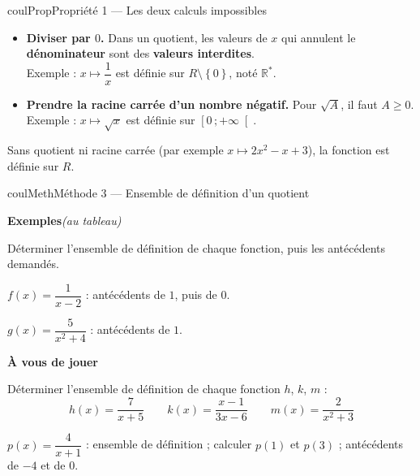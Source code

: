 \documentclass[11pt,a4paper]{article}
\makeatletter
\newcommand{\R}{\mathbb{R}}
\newcommand{\Rs}{\mathbb{R}^{*}}
\newcommand{\N}{\mathbb{N}}
\newcommand{\Z}{\mathbb{Z}}
\newcommand{\Q}{\mathbb{Q}}
\renewcommand{\ge}{\geqslant}
\newcommand{\vect}[1]{\overrightarrow{#1}}
\newcommand{\fois}[1]{\times{\color{coulExo}#1}}
\newcommand{\lycee@intfo}[2]{\left[#1\,;#2\right[}
\newcommand{\lycee@ens}[1]{\left\{#1\right\}}
\providecommand{\Cf}{\mathcal{C}\sb{f}}%
\providecommand{\Cg}{\mathcal{C}\sb{g}}%
\providecommand{\intfo}{\lycee@intfo}%
\providecommand{\ens}{\lycee@ens}}
\newcounter{lycee@signet}
\newcommand{\signet}[3][]{\stepcounter{lycee@signet}%
  \edef\lycee@dest{\if\relax\detokenize{#1}\relax
    signet.\arabic{lycee@signet}\else#1\fi}%
  \hypertarget{\lycee@dest}{}\bookmark[level=#2,dest=\lycee@dest]{#3}}
\def\R{R}\def\N{N}\def\Z{Z}\def\Q{Q}\def\vect#1{#1}\def\Cf{Cf}\def\Cg{Cg}\def\fois#1{×#1}%
\newcounter{methode}
\newenvironment{proprietebox}[1][Propriété]%
  {\begin{boitecours}[phantom={\signet{2}{#1}}]{coulProp}{#1}}{\end{boitecours}}
\newenvironment{methodebox}[1][Méthode]{\stepcounter{methode}%
  \begin{boitecours}[phantom={\signet[methode-\arabic{methode}]{2}{#1}}]{coulMeth}{#1}}%
  {\end{boitecours}}
\newcommand{\etape}[1]{\par\smallskip\textbf{\color{coulMeth}#1}\par\nobreak\smallskip}
\newcommand{\autableau}{\hfill{\footnotesize\itshape\color{black!45}(au tableau)}}
\newcommand{\etapeexemples}{%
    \par\smallskip\textbf{\color{coulMeth}Exemples}\autableau\par\nobreak\smallskip}
\makeatother
\begin{document}
\begin{proprietebox}[Propriété 1 --- Les deux calculs impossibles]
\begin{itemize}
  \item \textbf{Diviser par $0$.} Dans un quotient, les valeurs de $x$ qui annulent le
        \textbf{dénominateur} sont des \textbf{valeurs interdites}.\\
        Exemple : $x\mapsto\dfrac{1}{x}$ est définie sur $\R\setminus\ens{0}$, noté
        $\Rs$.
  \item \textbf{Prendre la racine carrée d'un nombre négatif.} Pour $\sqrt{A}$, il faut
        $A\ge 0$.\\
        Exemple : $x\mapsto\sqrt{x}$ est définie sur $\intfo{0}{+\infty}$.
\end{itemize}
Sans quotient ni racine carrée (par exemple $x\mapsto 2x^{2}-x+3$), la fonction est
définie sur $\R$.
\end{proprietebox}

\begin{methodebox}[Méthode 3 --- Ensemble de définition d'un quotient]
\etapeexemples
Déterminer l'ensemble de définition de chaque fonction, puis les antécédents demandés.
\begin{questions}[label=\alph*)]
  \item $f(x)=\dfrac{1}{x-2}$ : antécédents de $1$, puis de $0$.
  \item $g(x)=\dfrac{5}{x^{2}+4}$ : antécédents de $1$.
\end{questions}

\etape{À vous de jouer}
\begin{questions}
  \item Déterminer l'ensemble de définition de chaque fonction $h$, $k$, $m$ :
        \[
          h(x)=\frac{7}{x+5} \qquad k(x)=\frac{x-1}{3x-6} \qquad m(x)=\frac{2}{x^{2}+3}
        \]
  \item $p(x)=\dfrac{4}{x+1}$ : ensemble de définition ; calculer $p(1)$ et $p(3)$ ;
        antécédents de $-4$ et de $0$.
\end{questions}

\end{methodebox}
\end{document}
